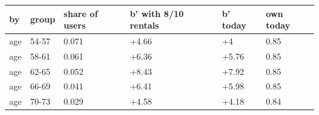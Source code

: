 \begingroup\small
\setlength{\tabcolsep}{3pt}
\renewcommand{\arraystretch}{1.04}
\begin{tabularx}{\linewidth}{XXXXXX}
\toprule
by & group & share of users & b' with 8/10 rentals & b' today & own today \\
\midrule
age & 54-57 & 0.071 & +4.66 & +4 & 0.85 \\
age & 58-61 & 0.061 & +6.36 & +5.76 & 0.85 \\
age & 62-65 & 0.052 & +8.43 & +7.92 & 0.85 \\
age & 66-69 & 0.041 & +6.41 & +5.98 & 0.85 \\
age & 70-73 & 0.029 & +4.58 & +4.18 & 0.84 \\
\bottomrule
\end{tabularx}
\endgroup
